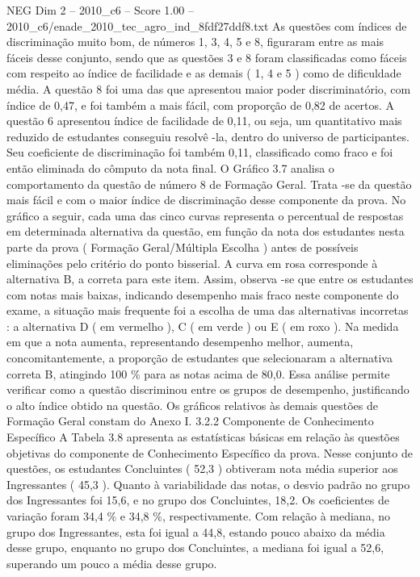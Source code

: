 \begin{textsample}{NEG Dim 2 – 2010\_c6 – Score 1.00 – 2010\_c6/enade\_2010\_tec\_agro\_ind\_8fdf27ddf8.txt}
As questões com índices de discriminação muito bom, de números 1, 3, 4, 5 e 8, figuraram entre as mais fáceis desse conjunto, sendo que as questões 3 e 8 foram classificadas como fáceis com respeito ao índice de facilidade e as demais ( 1, 4 e 5 ) como de dificuldade média.
A questão 8 foi uma das que apresentou maior poder discriminatório, com índice de 0,47, e foi também a mais fácil, com proporção de 0,82 de acertos.
A questão 6 apresentou índice de facilidade de 0,11, ou seja, um quantitativo mais reduzido de estudantes conseguiu resolvê -la, dentro do universo de participantes.
Seu coeficiente de discriminação foi também 0,11, classificado como fraco e foi então eliminada do cômputo da nota final.
O Gráfico 3.7 analisa o comportamento da questão de número 8 de Formação Geral.
Trata -se da questão mais fácil e com o maior índice de discriminação desse componente da prova.
No gráfico a seguir, cada uma das cinco curvas representa o percentual de respostas em determinada alternativa da questão, em função da nota dos estudantes nesta parte da prova ( Formação Geral/Múltipla Escolha ) antes de possíveis eliminações pelo critério do ponto bisserial.
A curva em rosa corresponde à alternativa B, a correta para este item.
Assim, observa -se que entre os estudantes com notas mais baixas, indicando desempenho mais fraco neste componente do exame, a situação mais frequente foi a escolha de uma das alternativas incorretas : a alternativa D ( em vermelho ), C ( em verde ) ou E ( em roxo ).
Na medida em que a nota aumenta, representando desempenho melhor, aumenta, concomitantemente, a proporção de estudantes que selecionaram a alternativa correta B, atingindo 100 \% para as notas acima de 80,0.
Essa análise permite verificar como a questão discriminou entre os grupos de desempenho, justificando o alto índice obtido na questão.
Os gráficos relativos às demais questões de Formação Geral constam do Anexo I. 3.2.2 Componente de Conhecimento Específico A Tabela 3.8 apresenta as estatísticas básicas em relação às questões objetivas do componente de Conhecimento Específico da prova.
Nesse conjunto de questões, os estudantes Concluintes ( 52,3 ) obtiveram nota média superior aos Ingressantes ( 45,3 ).
Quanto à variabilidade das notas, o desvio padrão no grupo dos Ingressantes foi 15,6, e no grupo dos Concluintes, 18,2.
Os coeficientes de variação foram 34,4 \% e 34,8 \%, respectivamente.
Com relação à mediana, no grupo dos Ingressantes, esta foi igual a 44,8, estando pouco abaixo da média desse grupo, enquanto no grupo dos Concluintes, a mediana foi igual a 52,6, superando um pouco a média desse grupo.

\end{textsample}
